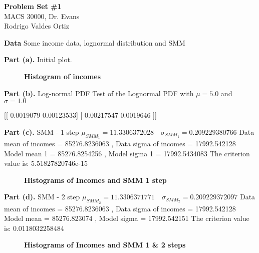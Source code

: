 \documentclass[letterpaper,12pt]{article}
\theoremstyle{definition}
\begin{document}
\begin{flushleft}
  \textbf{\large{Problem Set \#1}} \\
  MACS 30000, Dr. Evans \\
  Rodrigo Valdes Ortiz
\end{flushleft}

\vspace{5mm}

\noindent\textbf{Data}
Some income data, lognormal distribution and SMM

\textbf{Part (a).} Initial plot.

\begin{figure}[htb]\centering\captionsetup{width=4.0in}
  \caption{\textbf{Histogram of incomes}}\label{FigExample}
\end{figure}

\textbf{Part (b).} Log-normal PDF \newline
Test of the Lognormal PDF with $\mu = 5.0$ and $\sigma = 1.0$ \newline


[[ 0.0019079   0.00123533]
 [ 0.00217547  0.0019646 ]] \newline


\textbf{Part (c).} SMM - 1 step \newline
$\mu_{SMM_1}= 11.3306372028 \quad  \sigma_{SMM_1}= 0.209229380766$ \newline
Data mean of incomes = 85276.8236063 , Data sigma of incomes = 17992.542128 \newline
Model mean 1 = 85276.8254256 , Model sigma 1 = 17992.5434083 \newline
The criterion value is: 5.51827820746e-15 \newline


\begin{figure}[htb]\centering\captionsetup{width=4.0in}
  \caption{\textbf{Histograms of Incomes and SMM 1 step}}\label{FigExample}
\end{figure}


\textbf{Part (d).} SMM - 2 step \newline
$\mu_{SMM_2} = 11.3306371771 \quad \sigma_{SMM_2} = 0.209229372097$ \newline
Data mean of incomes = 85276.8236063 , Data sigma of incomes = 17992.542128 \newline
Model mean = 85276.823074 , Model sigma = 17992.542151 \newline
The criterion value is: 0.0118032258484 \newline


\begin{figure}[htb]\centering\captionsetup{width=4.0in}
  \caption{\textbf{Histograms of Incomes and SMM 1 \& 2 steps}}\label{FigExample}
\end{figure}
\end{document}
